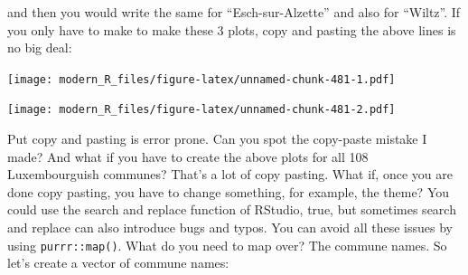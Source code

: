 \documentclass[]{gitbook}
\newenvironment{Shaded}{\begin{snugshade}}{\end{snugshade}}
\newcommand{\DataTypeTok}[1]{\textcolor[rgb]{0.13,0.29,0.53}{#1}}
\newcommand{\KeywordTok}[1]{\textcolor[rgb]{0.13,0.29,0.53}{\textbf{#1}}}
\newcommand{\NormalTok}[1]{#1}
\newcommand{\OperatorTok}[1]{\textcolor[rgb]{0.81,0.36,0.00}{\textbf{#1}}}
\newcommand{\StringTok}[1]{\textcolor[rgb]{0.31,0.60,0.02}{#1}}
\theoremstyle{definition}
\theoremstyle{definition}
\theoremstyle{definition}
\theoremstyle{remark}
\begin{document}
and then you would write the same for ``Esch-sur-Alzette'' and also for
``Wiltz''. If you only have to make to make these 3 plots, copy and
pasting the above lines is no big deal:

\begin{Shaded}
\end{Shaded}

\texttt{[image: modern\_R\_files/figure-latex/unnamed-chunk-481-1.pdf]}

\begin{Shaded}
\end{Shaded}

\texttt{[image: modern\_R\_files/figure-latex/unnamed-chunk-481-2.pdf]}

Put copy and pasting is error prone. Can you spot the copy-paste mistake
I made? And what if you have to create the above plots for all 108
Luxembourguish communes? That's a lot of copy pasting. What if, once you
are done copy pasting, you have to change something, for example, the
theme? You could use the search and replace function of RStudio, true,
but sometimes search and replace can also introduce bugs and typos. You
can avoid all these issues by using \texttt{purrr::map()}. What do you
need to map over? The commune names. So let's create a vector of commune
names:
\end{document}
